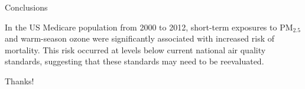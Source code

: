 \documentclass[ignorenonframetext,]{beamer}
\begin{document}
\begin{frame}{Conclusions}

In the US Medicare population from 2000 to 2012, short-term exposures to
PM\(_{2.5}\) and warm-season ozone were significantly associated with
increased risk of mortality. This risk occurred at levels below current
national air quality standards, suggesting that these standards may need
to be reevaluated.

\end{frame}

\begin{frame}{}

Thanks!

\end{frame}
\end{document}
